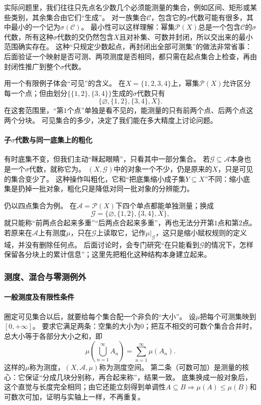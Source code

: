 实际问题里，我们往往只先点名少数几个必须能测量的集合，例如区间、矩形或某些类别，其余集合由它们“生成”。
对一族集合$\mathcal C$，包含它的$\sigma$代数可能有很多，其中最小的一个记为$\sigma(\mathcal C)$。
最小性可以这样理解：幂集$\mathcal P(X)$总是一个包含$\mathcal C$的$\sigma$代数，所有这种$\sigma$代数的交仍然包含$X$且对补集、可数并封闭，所以交出来的最小范围确实存在。
这种“只规定少数起点，再封闭出全部可测集”的做法非常省事：后面验证一个映射是否可测、两项测度是否相同，都只需在起点集合上检查，再由封闭性推广到整个$\sigma$代数。

用一个有限例子体会“可见”的含义。
在$X=\{1,2,3,4\}$上，幂集$\mathcal P(X)$允许区分每一个点；但由划分$\bigl\{\{1,2\},\{3,4\}\bigr\}$生成的$\sigma$代数只有
\[
 \bigl\{\varnothing,\{1,2\},\{3,4\},X\bigr\}.
\]
在这套范围里，“第$1$个点”单独是看不见的，能测量的只有前两个点、后两个点这两个分块。
可见集合的多少，决定了我们能在多大精度上讨论问题。

\paragraph{子$\sigma$代数与同一底集上的粗化}

有时底集不变，但我们主动“眯起眼睛”，只看其中一部分集合。
若$\mathcal G\subseteq\mathcal A$本身也是一个$\sigma$代数，就称它为。
$(X,\mathcal G)$中的对象一个不少，仍是原来的$X$，只是可见的集合变少了。
这种操作叫粗化，它和“把底集缩小成子集$Y\subseteq X$”不同：缩小底集是扔掉一批对象，粗化只是降低对同一批对象的分辨能力。

仍以四点集合为例。
在$\mathcal A=\mathcal P(X)$下四个单点都能单独测量；换成
\[
 \mathcal G=\{\varnothing,\{1,2\},\{3,4\},X\},
\]
就只能称“前两点合起来多重”“后两点合起来多重”，再也无法分开第$1$点和第$2$点。
若原来在$\mathcal A$上有测度$\mu$，只在$\mathcal G$上读取它，记作$\mu|_{\mathcal G}$，这只是缩小赋权规则的定义域，并没有删除任何点。
后面讨论时，会专门研究“在只能看到$\mathcal G$的情况下，怎样保留各分块上的累计信息”；这里先把粗化这种结构本身建立起来。

\subsubsection{测度、混合与零测例外}

\paragraph{一般测度及有限性条件}

圈定可见集合以后，就要给每个集合配一个非负的“大小”。
设$\mu$把每个可测集映到$[0,+\infty]$。
要求它满足两条：空集的大小为$0$；把互不相交的可数个集合合并时，总大小等于各部分大小之和，即
\[
 \mu\!\left(\bigcup_{n=1}^{\infty}A_n\right)=\sum_{n=1}^{\infty}\mu(A_n).
\]
这样的$\mu$称为测度，$(X,\mathcal A,\mu)$称为测度空间。
第二条（可数可加）是测量的核心：它保证“分成几块分别称，再合起来称”，结果一致。
底集换成一般对象后，这个直觉与长度完全相同；由它还能立刻得到单调性$A\subseteq B\Rightarrow\mu(A)\leq\mu(B)$和可数次可加，证明与实轴上一样，不再重复。

